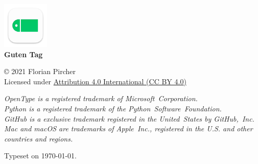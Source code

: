 \begin{center}
  \vfill
  
  \includegraphics[width=6em]{Images/Icon.pdf} \\
  \textbf{Guten Tag} \\
  
  \vfill
  
  © 2021 Florian Pircher \\
  {Licensed under \href{https://creativecommons.org/licenses/by/4.0/}{Attribution 4.0 International ({\lsstyle{}CC BY 4.0})}}
  
  \bigskip
  
  \bgroup
  \fontsize{8.5pt}{12pt}\selectfont
  
  \emph{\emph{OpenType} is a registered trademark of Microsoft~Corporation.} \\
  \emph{\emph{Python} is a registered trademark of the Python~Software~Foundation.} \\
  \emph{\emph{GitHub} is a exclusive trademark registered in the United~States by GitHub,~Inc.} \\
  \emph{\emph{Mac} and \emph{macOS} are trademarks of Apple~Inc., registered in the U.S. and other countries and regions.} \\
  \egroup
  
  \bigskip
  
  Typeset on \today.
\end{center}
